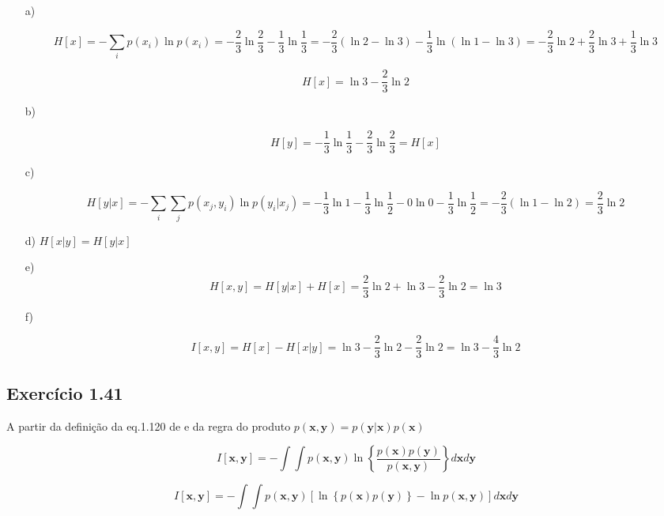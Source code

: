 \documentclass{article}
\begin{document}
  \begin{itemize}
  	\item [a)] 
  	
  	  \[
  	  	H[x] = -\sum_{i} p(x_{i}) \ln p(x_{i}) = -\frac{2}{3} \ln \frac{2}{3} - \frac{1}{3} \ln \frac{1}{3} = -\frac{2}{3} \left(\ln 2 - \ln 3\right) - \frac{1}{3} \ln \left(\ln 1 - \ln 3\right) = -\frac{2}{3} \ln 2 + \frac{2}{3} \ln 3 +\frac{1}{3} \ln 3
  	  \]
  	  
  	  \[
  	    H [x] = \ln 3 -\frac{2}{3} \ln 2
  	  \]
  	
  	\item [b)] 
  	
  	  \[
  	    H [y] = -\frac{1}{3} \ln \frac{1}{3} -\frac{2}{3} \ln \frac{2}{3} = H[x]
  	  \]
  	  
  	\item [c)]
  	  
  	  \[
  	   H[y|x] = -\sum_{i} \sum_{j} p(x_{j},y_{i}) \ln p(y_{i}|x_{j}) = -\frac{1}{3} \ln 1 -\frac{1}{3} \ln \frac{1}{2} - 0 \ln 0 -\frac{1}{3} \ln \frac{1}{2} = -\frac{2}{3} \left(\ln 1 - \ln 2\right) = \frac{2}{3} \ln 2
  	  \]
  	 
  	\item [d)] $H[x|y] = H[y|x]$
  	\item [e)]
  	    \[
  	      H[x,y] = H[y|x]+H[x]= \frac{2}{3} \ln 2 + \ln 3 -  \frac{2}{3} \ln 2 = \ln 3
  	    \]
  	    
  	\item [f)]
  	    
  	    \[
  	      I[x,y] = H[x]-H[x|y]= \ln 3 - \frac{2}{3} \ln 2 - \frac{2}{3} \ln 2 = \ln 3 - \frac{4}{3} \ln 2
  	    \]
  	
  	
  \end{itemize}

\subsection{ Exerc\'icio 1.41}

  A partir da definição da eq.1.120 de \cite{Bishop2006} e da regra do produto $p(\mathbf{x},\mathbf{y})= p(\mathbf{y}|\mathbf{x}) p(\mathbf{x})$
  
  \begin{equation}
  	I[\mathbf{x},\mathbf{y}] = - \int \int p(\mathbf{x},\mathbf{y}) \ln \left\{\frac{p(\mathbf{x}) p(\mathbf{y})}{p(\mathbf{x},\mathbf{y})}\right\} d \mathbf{x} d \mathbf{y}
  \end{equation}
   
   \[
    I[\mathbf{x},\mathbf{y}] = -\int \int p(\mathbf{x},\mathbf{y}) \left[\ln \left\{ p(\mathbf{x}) p(\mathbf{y})\right\} - \ln p(\mathbf{x},\mathbf{y})  \right] d \mathbf{x} d \mathbf{y}
   \]
   
\end{document}

